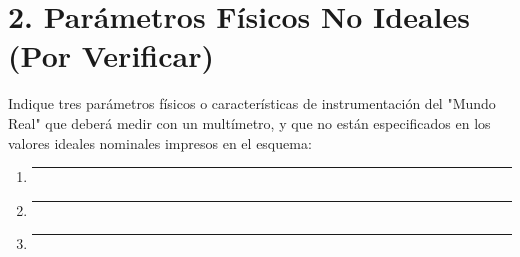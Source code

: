\documentclass[11pt, a4paper]{article}
\begin{document}
\section*{2. Parámetros Físicos No Ideales (Por Verificar)}
Indique tres parámetros físicos o características de instrumentación del "Mundo Real" que deberá medir con un multímetro, y que no están especificados en los valores ideales nominales impresos en el esquema:

\begin{enumerate}\setlength\itemsep{1cm}
    \item \rule{\textwidth}{0.4pt}
    \item \rule{\textwidth}{0.4pt}
    \item \rule{\textwidth}{0.4pt}
\end{enumerate}
\end{document}
